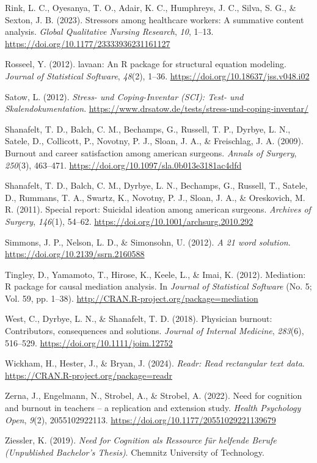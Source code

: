 \documentclass[
  man]{apa6}
\newlength{\cslhangindent}
\newenvironment{CSLReferences}[2] %
 {\begin{list}{}{%
  \setlength{\itemindent}{0pt}
  \setlength{\leftmargin}{0pt}
  \setlength{\parsep}{0pt}
  \ifodd #1
   \setlength{\leftmargin}{\cslhangindent}
   \setlength{\itemindent}{-1\cslhangindent}
  \fi
  \setlength{\itemsep}{#2\baselineskip}}}
 {\end{list}}
\begin{document}
\begin{CSLReferences}{1}{0}
Rink, L. C., Oyesanya, T. O., Adair, K. C., Humphreys, J. C., Silva, S. G., \& Sexton, J. B. (2023). Stressors among healthcare workers: A summative content analysis. \emph{Global Qualitative Nursing Research}, \emph{10}, 1--13. \url{https://doi.org/10.1177/23333936231161127}

Rosseel, Y. (2012). {lavaan}: An {R} package for structural equation modeling. \emph{Journal of Statistical Software}, \emph{48}(2), 1--36. \url{https://doi.org/10.18637/jss.v048.i02}

Satow, L. (2012). \emph{{Stress- und Coping-Inventar (SCI): Test- und Skalendokumentation}}. \url{https://www.drsatow.de/tests/stress-und-coping-inventar/}

Shanafelt, T. D., Balch, C. M., Bechamps, G., Russell, T. P., Dyrbye, L. N., Satele, D., Collicott, P., Novotny, P. J., Sloan, J. A., \& Freischlag, J. A. (2009). Burnout and career satisfaction among american surgeons. \emph{Annals of Surgery}, \emph{250}(3), 463--471. \url{https://doi.org/10.1097/sla.0b013e3181ac4dfd}

Shanafelt, T. D., Balch, C. M., Dyrbye, L. N., Bechamps, G., Russell, T., Satele, D., Rummans, T. A., Swartz, K., Novotny, P. J., Sloan, J. A., \& Oreskovich, M. R. (2011). Special report: Suicidal ideation among american surgeons. \emph{Archives of Surgery}, \emph{146}(1), 54--62. \url{https://doi.org/10.1001/archsurg.2010.292}

Simmons, J. P., Nelson, L. D., \& Simonsohn, U. (2012). \emph{A 21 word solution}. \url{https://doi.org/10.2139/ssrn.2160588}

Tingley, D., Yamamoto, T., Hirose, K., Keele, L., \& Imai, K. (2012). Mediation: R package for causal mediation analysis. In \emph{Journal of Statistical Software} (No. 5; Vol. 59, pp. 1--38). \url{http://CRAN.R-project.org/package=mediation}

West, C., Dyrbye, L. N., \& Shanafelt, T. D. (2018). Physician burnout: Contributors, consequences and solutions. \emph{Journal of Internal Medicine}, \emph{283}(6), 516--529. \url{https://doi.org/10.1111/joim.12752}

Wickham, H., Hester, J., \& Bryan, J. (2024). \emph{Readr: Read rectangular text data}. \url{https://CRAN.R-project.org/package=readr}

Zerna, J., Engelmann, N., Strobel, A., \& Strobel, A. (2022). Need for cognition and burnout in teachers -- a replication and extension study. \emph{Health Psychology Open}, \emph{9}(2), 2055102922113. \url{https://doi.org/10.1177/20551029221139679}

Ziessler, K. (2019). \emph{{Need for Cognition als Ressource für helfende Berufe} ({Unpublished Bachelor's Thesis})}. Chemnitz University of Technology.

\end{CSLReferences}
\end{document}

